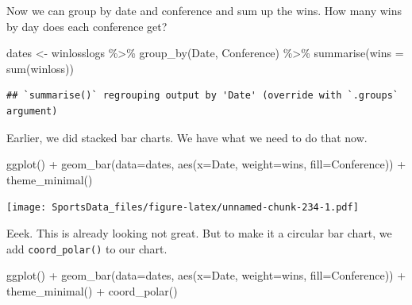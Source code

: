 \documentclass[
]{book}
\newenvironment{Shaded}{\begin{snugshade}}{\end{snugshade}}
\newcommand{\AttributeTok}[1]{\textcolor[rgb]{0.77,0.63,0.00}{#1}}
\newcommand{\FunctionTok}[1]{\textcolor[rgb]{0.00,0.00,0.00}{#1}}
\newcommand{\NormalTok}[1]{#1}
\newcommand{\OtherTok}[1]{\textcolor[rgb]{0.56,0.35,0.01}{#1}}
\newcommand{\SpecialCharTok}[1]{\textcolor[rgb]{0.00,0.00,0.00}{#1}}
\begin{document}
Now we can group by date and conference and sum up the wins. How many wins by day does each conference get?

\begin{Shaded}
\begin{Highlighting}[]
\NormalTok{dates }\OtherTok{\textless{}{-}}\NormalTok{ winlosslogs }\SpecialCharTok{\%\textgreater{}\%} \FunctionTok{group\_by}\NormalTok{(Date, Conference) }\SpecialCharTok{\%\textgreater{}\%} \FunctionTok{summarise}\NormalTok{(}\AttributeTok{wins =} \FunctionTok{sum}\NormalTok{(winloss))}
\end{Highlighting}
\end{Shaded}

\begin{verbatim}
## `summarise()` regrouping output by 'Date' (override with `.groups` argument)
\end{verbatim}

Earlier, we did stacked bar charts. We have what we need to do that now.

\begin{Shaded}
\begin{Highlighting}[]
\FunctionTok{ggplot}\NormalTok{() }\SpecialCharTok{+} \FunctionTok{geom\_bar}\NormalTok{(}\AttributeTok{data=}\NormalTok{dates, }\FunctionTok{aes}\NormalTok{(}\AttributeTok{x=}\NormalTok{Date, }\AttributeTok{weight=}\NormalTok{wins, }\AttributeTok{fill=}\NormalTok{Conference)) }\SpecialCharTok{+} \FunctionTok{theme\_minimal}\NormalTok{()}
\end{Highlighting}
\end{Shaded}

\texttt{[image: SportsData\_files/figure-latex/unnamed-chunk-234-1.pdf]}

Eeek. This is already looking not great. But to make it a circular bar chart, we add \texttt{coord\_polar()} to our chart.

\begin{Shaded}
\begin{Highlighting}[]
\FunctionTok{ggplot}\NormalTok{() }\SpecialCharTok{+} \FunctionTok{geom\_bar}\NormalTok{(}\AttributeTok{data=}\NormalTok{dates, }\FunctionTok{aes}\NormalTok{(}\AttributeTok{x=}\NormalTok{Date, }\AttributeTok{weight=}\NormalTok{wins, }\AttributeTok{fill=}\NormalTok{Conference)) }\SpecialCharTok{+} \FunctionTok{theme\_minimal}\NormalTok{() }\SpecialCharTok{+} \FunctionTok{coord\_polar}\NormalTok{()}
\end{Highlighting}
\end{Shaded}
\end{document}
